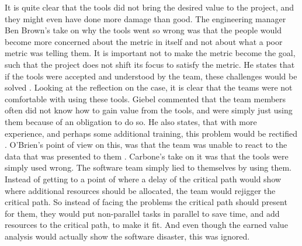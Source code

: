 It is quite clear that the tools did not bring the desired value to the project, and they might even have done more damage than good.
The engineering manager Ben Brown's take on why the tools went so wrong was that the people would become more concerned about the metric in itself and not about what a poor metric was telling them. It is important not to make the metric become the goal, such that the project does not shift its focus to satisfy the metric. He states that if the tools were accepted and understood by the team, these challenges would be solved \cite[p. 12]{GinoPisano2005}.
Looking at the reflection on the case, it is clear that the teams were not comfortable with using these tools. Giebel commented that the team members often did not know how to gain value from the tools, and were simply just using them because of an obligation to do so. He also states, that with more experience, and perhaps some additional training, this problem would be rectified \cite[p. 11]{GinoPisano2005}.
O'Brien's point of view on this, was that the team was unable to react to the data that was presented to them \cite[p. 11]{GinoPisano2005}.
Carbone's take on it was that the tools were simply used wrong. The software team simply lied to themselves by using them. Instead of getting to a point of where a delay of the critical path would show where additional resources should be allocated, the team would rejigger the critical path. So instead of facing the problems the critical path should present for them, they would put non-parallel tasks in parallel to save time, and add resources to the critical path, to make it fit. And even though the earned value analysis would actually show the software disaster, this was ignored. \cite[p. 11]{GinoPisano2005}


